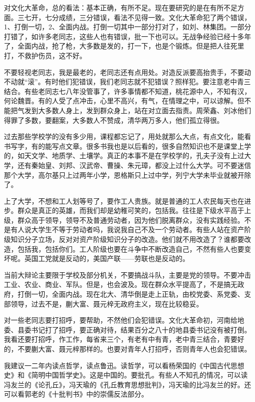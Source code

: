 对文化大革命，总的看法：基本正确，有所不足。现在要研究的是在有所不足方面。三七开，七分成绩，三分错误，看法不见得一致。文化大革命犯了两个错误，1、打倒一切，2、全面内战。打倒一切其中一部分打对了，如刘、林集团。一部分打错了，如许多老同志，这些人也有错误，批一下也可以。无战争经验已经十多年了，全面内战，抢了枪，大多数是发的，打一下，也是个锻炼。但是把人往死里打，不救护伤员，这不好。

不要轻视老同志，我是最老的，老同志还有点用处。对造反派要高抬贵手，不要动不动就“滚”。有时他们犯错误，我们老同志就不犯错误？照样犯。要注意老中青三结合。有些老同志七八年没管事了，许多事情都不知道，桃花源中人，不知有汉，何论魏晋。有的人受了点冲击，心里不高兴，有气，在情理之中，可以谅解。但不能把气发到大多数人身上，发到群众身上，站在对立面去指责。周荣鑫、刘冰他们得罪了多数，要翻案，大多数人不赞成，清华两万多人，他们孤立得很。

过去那些学校学的没有多少用，课程都忘记了，用处就那么大点，有点文化，能看书写字，有的能写点文章。很多书我也是以后看的，很多自然知识也不是课堂上学的，如天文学、地质学、土壤学。真正的本事不是在学校学的，孔夫子没有上过大学，还有秦始皇、刘邦、汉武帝、曹操、朱元璋，都没上过什么大学。可不要迷信那个大学，高尔基只上过两年小学，恩格斯只上过中学，列宁大学未毕业就被开除了。

上了大学，不想和工人划等号了，要作工人贵族。就是普通的工人农民每天也在进步。群众是真正的英雄，而我们却是幼稚可笑的，包括我。往往是下级水平高于上级，群众高于领导，领导不及普通劳动者，因为他们脱离群众，没有实践经验。不是有人说大学生不等于劳动者吗，我说我自己不及一个劳动者。有些人站在资产阶级知识分子立场，反对对资产阶级知识分子的改造。他们就不用改造了？谁都要改造，包括我，包括你们。工人阶级也要在斗争中不断改造自己，不然有些人也要变坏呢。英国工党就是反动的，美国产联——劳联也是反动的。

当前大辩论主要限于学校及部分机关，不要搞战斗队，主要是党的领导。不要冲击工业、农业、商业、军队。但是，也会波及。现在群众水平提高了，不是搞无政府，打倒一切，全面内战。现在北大、清华倒是走上正轨，由校党委、系党委、支部领导，过去不是，蒯大富、聂元梓无政府主义，现在比较稳妥。

对一些老同志要打招呼，要帮助，不然他们会犯错误。文化大革命初，河南给地委、县委书记打了招呼，要正确对待，结果百分之八十的地县委书记没有被打倒。我看还要打招呼，作工作，每省来三个，有老有中有青，老中青三结合，青要好的，不要蒯大富、聂元梓那样的。也要对青年人打招呼，否则青年人也会犯错误。

我建议一二年内读点哲学，读点鲁迅。读哲学，可以看杨荣国的《中国古代思想史》和《简明中国哲学史》。这是中国的。要批孔。有些人不知孔的情况，可以读冯友兰的《论孔丘》，冯天瑜的《孔丘教育思想批判》，冯天瑜的比冯友兰的好。还可以看郭老的《十批判书》中的崇儒反法部分。

